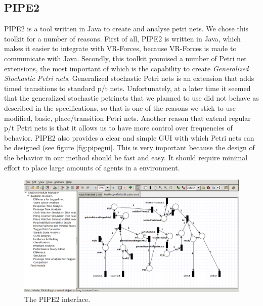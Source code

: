 \documentclass[11pt, a4paper]{book}
\begin{document}
\subsection{PIPE2}
PIPE2 is a tool written in Java to create and analyse petri nets. We chose this toolkit for a number of reasons. First of all, PIPE2 is written in Java, which makes it easier to integrate with VR-Forces, because VR-Forces is made to communicate with Java. Secondly, this toolkit promised a number of Petri net extensions, the most important of which is the capability to create \emph{Generalized Stochastic Petri nets}. Generalized stochastic Petri nets is an extension that adds timed transitions to standard p/t nets. Unfortunately, at a later time it seemed that the generalized stochastic petrinets that we planned to use did not behave as described in the specifications, so that is one of the reasons we stick to use modified, basic, place/transition Petri nets. Another reason that extend regular p/t Petri nets is that it allows us to have more control over frequencies of behavior. PIPE2 also provides a clear and simple GUI with which Petri nets can be designed (see figure \ref{fig:pipegui}. This is very important because the design of the behavior in our method should be fast and easy. It should require minimal effort to place large amounts of agents in a environment. 

\begin{figure}
\centering
\includegraphics[width=.8\textwidth]{pipe_screenshot}
\caption{The PIPE2 interface.}
\label{pipegui}
\end{figure}
\end{document}
